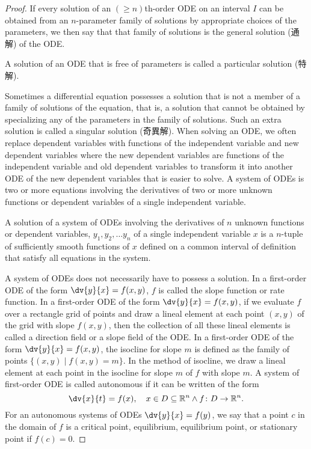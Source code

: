 \documentclass[a4paper,12pt]{report}
\begin{document}
\begin{itemize}
\begin{itemize}
\begin{proof}
If every solution of an $(\geq n)$th-order ODE on an interval $I$ can be obtained from an $n$-parameter family of solutions by appropriate choices of the parameters, we then say that that family of solutions is the general solution (通解) of the ODE.

A solution of an ODE that is free of parameters is called a particular solution (特解).

Sometimes a differential equation possesses a solution that is not a member of a family of solutions of the equation, that is, a solution that cannot be obtained by specializing any of the parameters in the family of solutions. Such an extra solution is called a singular solution (奇異解).
When solving an ODE, we often replace dependent variables with functions of the independent variable and new dependent variables where the new dependent variables are functions of the independent variable and old dependent variables to transform it into another ODE of the new dependent variables that is easier to solve.
A system of ODEs is two or more equations involving the derivatives of two or more unknown functions or dependent variables of a single independent variable.

A solution of a system of ODEs involving the derivatives of $n$ unknown functions or dependent variables, $y_1,y_2,\dots y_n$ of a single independent variable $x$ is a $n$-tuple of sufficiently smooth functions of $x$ defined on a common interval of definition that satisfy all equations in the system.

A system of ODEs does not necessarily have to possess a solution.
In a first-order ODE of the form $\dv{y}{x}=f(x,y)$, $f$ is called the slope function or rate function.
In a first-order ODE of the form $\dv{y}{x}=f(x,y)$, if we evaluate $f$ over a rectangle grid of points and draw a lineal element at each point $(x,y)$ of the grid with slope $f(x,y)$, then the collection of all these lineal elements is called a direction field or a slope field of the ODE.
In a first-order ODE of the form $\dv{y}{x}=f(x,y)$, the isocline for slope $m$ is defined as the family of points $\{(x,y)\mid f(x,y)=m\}$. In the method of isocline, we draw a lineal element at each point in the isocline for slope $m$ of $f$ with slope $m$.
A system of first-order ODE is called autonomous if it can be written of the form
\[\dv{x}{t}=f(x),\quad x\in D\subseteq\mathbb{R}^n\land f\colon D\to\mathbb{R}^n.\]
For an autonomous systems of ODEs $\dv{y}{x}=f(y)$, we say that a point $c$ in the domain of $f$ is a critical point, equilibrium, equilibrium point, or stationary point if $f(c)=0$.


\end{proof}
\end{itemize}
\end{itemize}
\end{document}

